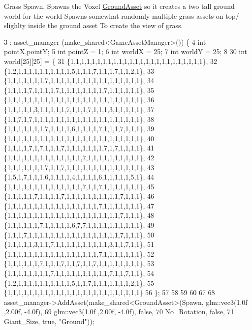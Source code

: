 Grass Spawn. Spawns the Voxel \hyperlink{class_ground_asset}{Ground\+Asset} so it creates a two tall ground world for the world Spawns somewhat randomly multiple grass assets on top/ slighlty inside the ground asset To create the view of grass.
\begin{DoxyCode}
3                      : asset\_manager (make\_shared<GameAssetManager>())  \{ 
4   \textcolor{keywordtype}{int} pointX,pointY;
5   \textcolor{keywordtype}{int} pointZ = 1;
6   \textcolor{keywordtype}{int} worldX = 25;
7   \textcolor{keywordtype}{int} worldY = 25;
8 
30   \textcolor{keywordtype}{int} world[25][25] = \{
31   \{1,1,1,1,1,1,1,1,1,1,1,1,1,1,1,1,1,1,1,1,1,1,1,1,1\},
32   \{1,2,1,1,1,1,1,1,1,1,1,1,5,1,1,1,7,1,1,1,7,1,1,2,1\},
33   \{1,1,1,1,1,1,1,7,1,1,1,1,1,1,1,1,1,1,1,1,1,1,1,1,1\},
34   \{1,1,1,1,7,1,1,1,1,7,1,1,1,1,1,1,1,1,7,1,1,1,1,1,1\},
35   \{1,1,1,1,1,1,1,1,1,1,1,1,1,1,1,1,1,1,1,1,1,1,1,1,1\},
36   \{1,1,1,1,1,3,1,1,1,1,1,7,1,1,1,7,1,1,1,3,1,1,1,1,1\},
37   \{1,1,7,1,7,1,1,1,1,1,1,1,1,1,1,1,1,1,1,1,1,1,1,1,1\},
38   \{1,1,1,1,1,1,1,7,1,1,1,1,6,1,1,1,1,7,1,1,1,7,1,1,1\},
39   \{1,1,1,1,1,1,1,1,1,1,1,1,1,1,1,1,1,1,1,1,1,1,1,1,1\},
40   \{1,1,1,1,7,1,7,1,1,1,7,1,1,1,1,1,1,1,7,1,7,1,1,1,1\},
41   \{1,1,1,1,1,1,1,1,1,1,1,1,1,1,7,1,1,1,1,1,1,1,1,1,1\},
42   \{1,1,1,1,1,1,1,7,1,1,7,1,1,1,1,1,1,1,1,1,1,1,1,1,1\},
43   \{1,5,1,7,1,1,1,6,1,1,1,1,4,1,1,1,1,6,1,1,1,1,1,5,1\},
44   \{1,1,1,1,1,1,1,1,1,1,1,1,1,1,7,1,1,7,1,1,1,1,1,1,1\},
45   \{1,1,1,1,1,7,1,1,1,1,7,1,1,1,1,1,1,1,1,1,1,7,1,1,1\},
46   \{1,1,1,1,1,1,1,1,1,1,1,1,1,1,1,1,1,7,1,1,1,1,1,1,1\},
47   \{1,1,1,1,1,1,1,1,1,1,1,1,1,1,1,1,1,1,1,1,1,7,1,1,1\},
48   \{1,1,1,1,1,1,7,1,1,1,1,1,6,7,7,1,1,1,1,1,1,1,1,1,1\},
49   \{1,1,1,7,1,1,1,1,1,1,1,1,1,1,1,1,1,1,1,1,1,7,1,1,1\},
50   \{1,1,1,1,1,3,1,1,7,1,1,1,1,1,1,1,1,1,1,3,1,1,7,1,1\},
51   \{1,1,1,1,1,1,1,1,1,1,1,1,1,1,1,1,1,7,1,1,1,1,1,1,1\},
52   \{1,1,1,1,1,1,7,1,1,1,7,1,1,7,1,1,7,1,1,1,1,1,1,1,1\},
53   \{1,1,1,1,1,1,1,1,7,1,1,1,1,1,1,1,1,1,1,7,1,1,7,1,1\},
54   \{1,2,1,1,1,1,1,1,1,1,1,1,5,1,1,7,1,1,1,1,1,1,1,2,1\},
55   \{1,1,1,1,1,1,1,1,1,1,1,1,1,1,1,1,1,1,1,1,1,1,1,1,1\}        
56   \};
57                    
58                                    
59       
60         
67 
68         asset\_manager->AddAsset(make\_shared<GroundAsset>(Spawn, glm::vec3(1.0f ,2.00f, -4.0f),
69                                                          glm::vec3(1.0f ,2.00f, -4.0f), \textcolor{keyword}{false},
70                                                          No\_Rotation, \textcolor{keyword}{false},
71                                                          Giant\_Size, \textcolor{keyword}{true}, \textcolor{stringliteral}{"Ground"}));

\end{DoxyCode}
